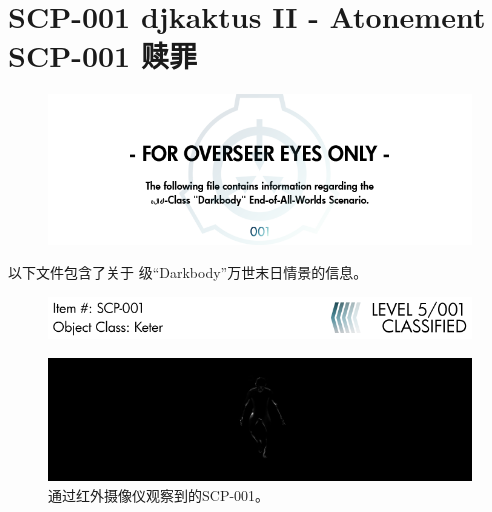 \section[SCP-001 赎罪]{
    SCP-001 djkaktus II - Atonement\\
    SCP-001 赎罪
}

\label{sec:SCP-001.atonement}

\begin{center}

\begin{figure}[H]
    \centering
    \includegraphics[width=\linewidth]{images/SCP-001-atonement.png}
\end{figure}


以下文件包含了关于
级“Darkbody”万世末日情景的信息。



\end{center}

\newpage

\begin{figure}[H]
    \centering
    \includegraphics[width=\linewidth]{images/SCP-001-atonement-2.png}
\end{figure}

\begin{figure}[H]
    \centering
    \includegraphics[width=\linewidth]{images/SCP-001-atonement-3.jpg}
    \caption*{通过红外摄像仪观察到的SCP-001。}
\end{figure}

